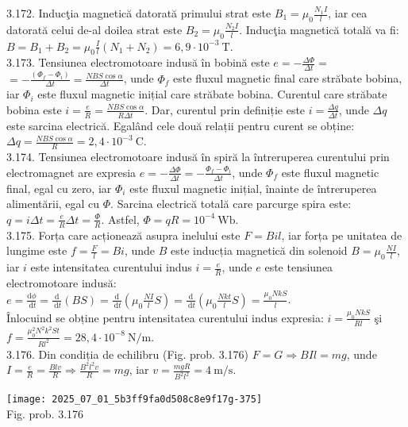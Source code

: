 \begin{center}
3.172. Inducţia magnetică datorată primului strat este $B_{1}=\mu_{0} \frac{N_{1} I}{l}$, iar cea datorată celui de-al doilea strat este $B_{2}=\mu_{0} \frac{N_{2} I}{l}$. Inducţia magnetică totală va fi: $B=B_{1}+B_{2}=\mu_{0} \frac{I}{l}\left(N_{1}+N_{2}\right)=6,9 \cdot 10^{-3} \mathrm{~T}$.\\

3.173. Tensiunea electromotoare indusă în bobină este $e=-\frac{\Delta \Phi}{\Delta t}=$ $=-\frac{\left(\Phi_{f}-\Phi_{i}\right)}{\Delta t}=\frac{N B S \cos \alpha}{\Delta t}$, unde $\Phi_{f}$ este fluxul magnetic final care străbate bobina, iar $\Phi_{i}$ este fluxul magnetic inițial care străbate bobina. Curentul care străbate bobina este $i=\frac{e}{R}=\frac{N B S \cos \alpha}{R \Delta t}$. Dar, curentul prin definiție este $i=\frac{\Delta q}{\Delta t}$, unde $\Delta q$ este sarcina electrică. Egalând cele două relații pentru curent se obține:\\ $\Delta q=\frac{N B S \cos \alpha}{R}=2,4 \cdot 10^{-3} \mathrm{~C}$.\\

3.174. Tensiunea electromotoare indusă în spiră la întreruperea curentului prin electromagnet are expresia $e=-\frac{\Delta \Phi}{\Delta t}=-\frac{\Phi_{f}-\Phi_{i}}{\Delta t}$, unde $\Phi_{f}$ este fluxul magnetic final, egal cu zero, iar $\Phi_{i}$ este fluxul magnetic inițial, înainte de întreruperea alimentării, egal cu $\Phi$. Sarcina electrică totală care parcurge spira este: $q=i \Delta t=\frac{e}{R} \Delta t=\frac{\Phi}{R}$. Astfel, $\Phi=q R=10^{-4} \mathrm{~Wb}$.\\

3.175. Forța care acționează asupra inelului este $F=B i l$, iar forța pe unitatea de lungime este $f=\frac{F}{l}=B i$, unde $B$ este inducția magnetică din solenoid $B=\mu_{0} \frac{N I}{l}$, iar $i$ este intensitatea curentului indus $i=\frac{e}{R}$, unde $e$ este tensiunea electromotoare indusă:\\ $e=\frac{\mathrm{d} \phi}{\mathrm{~d} t}=\frac{\mathrm{d}}{\mathrm{~d} t}(B S)=\frac{\mathrm{d}}{\mathrm{~d} t}\left(\mu_{0} \frac{N I}{l} S\right)=\frac{\mathrm{d}}{\mathrm{~d} t}\left(\mu_{0} \frac{N k t}{l} S\right)=\frac{\mu_{0} N k S}{l}$.\\ Înlocuind se obține pentru intensitatea curentului indus expresia: $i=\frac{\mu_{0} N k S}{R l}$ şi $f=\frac{\mu_{0}^{2} N^{2} k^{2} S t}{R l^{2}}=28,4 \cdot 10^{-8} \mathrm{~N} / \mathrm{m}$.\\

3.176. Din condiția de echilibru (Fig. prob. 3.176) $F=G \Rightarrow B I l=m g$, unde $I=\frac{e}{R}=\frac{B l v}{R} \Rightarrow \frac{B^{2} l^{2} v}{R}=m g$, iar $v=\frac{m g R}{B^{2} l^{2}}=4 \mathrm{~m} / \mathrm{s}$.\\ \begin{center} \texttt{[image: 2025\_07\_01\_5b3ff9fa0d508c8e9f17g-375]}\\ Fig. prob. 3.176 \end{center}\\


\end{center}
